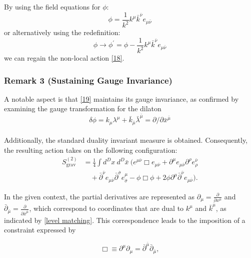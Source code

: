 \documentclass[13pt]{article}
\begin{document}
By using the field equations for $\phi$:
\begin{equation}
\phi = \frac{1}{k^2} k^{\mu}\bar{k}^{\bar{\nu}}e_{\mu \bar{\nu}} \tag{20}
\end{equation}
or alternatively using the redefinition:
\begin{equation}
\phi \rightarrow \phi^{\prime} = \phi - \frac{1}{k^2} k^{\mu}\bar{k}^{\bar{\nu}}e_{\mu \bar{\nu}} \tag{21}
\end{equation}
we can regain the non-local action \eqref{18}.

\subsubsection*{Remark 3 (Sustaining Gauge Invariance)}
A notable aspect is that \eqref{19} maintains its gauge invariance, as confirmed by examining the gauge transformation for the dilaton \begin{equation}
    \delta \phi = k_{\mu}\lambda^{\mu} + \bar{k}_{\bar{\mu}}\bar{\lambda}^{\bar{\mu}} = \partial / \partial \bar{x}^{\bar{\mu}}
\tag{22}
\label{22}
\end{equation}
\\
Additionally, the standard duality invariant measure is obtained. Consequently, the resulting action takes on the following configuration:
\begin{align}
S_{\text{grav}}^{(2)} &= \frac{1}{4} \int d^D x \ d^D \bar{x} \ (e^{\mu \bar{\nu}}\Box e_{\mu \bar{\nu}} + \partial^{\mu}e_{\mu \bar{\nu}}\partial^{\rho}e_{\rho}^{\bar{\nu}} \nonumber \\
&\quad + \bar{\partial}^{\bar{\nu}}e_{\mu \bar{\nu}}\bar{\partial}^{\bar{\sigma}}e^{\mu}_{\bar{\sigma}} - \phi \Box \phi + 2\phi \partial^{\mu}\bar{\partial}^{\bar{\nu}}e_{\mu \bar{\nu}}). \tag{23}
\label{23}
\end{align}


In the given context, the partial derivatives are represented as $\partial_\mu = \frac{\partial}{\partial x^\mu}$ and $\bar\partial_{\bar{\mu}} = \frac{\partial}{\partial \bar{x}^{\bar{\mu}}}$, which correspond to coordinates that are dual to $k^\mu$ and $\bar k^{\bar \mu}$, as indicated by \eqref{level matching}. This correspondence leads to the imposition of a constraint expressed by

\begin{equation}
\Box \equiv \partial^\mu\partial_\mu = \bar\partial^{\bar{\mu}}\bar\partial_{\bar{\mu}},
\tag{24}
\label{constraint}
\end{equation}
\end{document}
